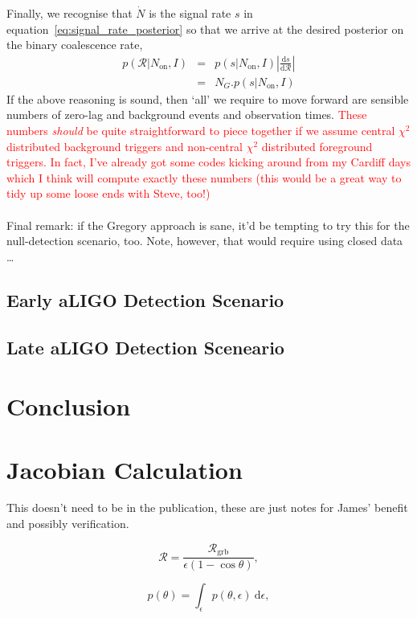 \documentclass[nofootinbib]{revtex4}
\newcommand{\grbrate}{{{\mathcal R}_{\mathrm{grb}}}}
\newcommand{\cbcrate}{{{\mathcal R}}}
\newcommand{\diff}{{\mathrm d}}
\begin{document}
Finally, we recognise that $\dot{N}$ is the signal rate $s$ in
equation~\ref{eq:signal_rate_posterior} so that we arrive at the desired
posterior on the binary coalescence rate, 
%
\begin{eqnarray}
p(\cbcrate|N_{\textrm{on}},I) & = & p(s|N_{\textrm{on}},I) \left|\frac{\diff
s}{\diff \cbcrate}\right| \\
& = & N_G . p(s|N_{\textrm{on}},I)
\end{eqnarray}
%
If the above reasoning is sound, then `all' we require to move forward are
sensible numbers of zero-lag and background events and observation times.
\textcolor{red}{These numbers \emph{should} be quite straightforward to piece
together if we assume central $\chi^2$ distributed background triggers and
non-central $\chi^2$ distributed foreground triggers.  In fact, I've already got
some codes kicking around from my Cardiff days which I think will compute
exactly these numbers (this would be a great way to tidy up some loose ends with
Steve, too!)}
\\ \\
Final remark: if the Gregory approach is sane, it'd be tempting to try this for
the null-detection scenario, too.  Note, however, that would require using
closed data \dots

\subsection{Early aLIGO Detection Scenario}
\subsection{Late aLIGO Detection Sceneario}

\section{Conclusion}

\appendix
\section{Jacobian Calculation}
This doesn't need to be in the publication, these are just notes for James'
benefit and possibly verification.

\begin{equation}
\cbcrate=\frac{\grbrate}{\epsilon(1-\cos \theta)},
\end{equation}

\begin{equation}
p(\theta) = \int_{\epsilon} p(\theta,\epsilon)~\diff \epsilon,
\end{equation}
\end{document}

